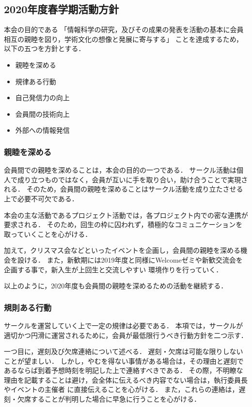 \subsection*{2020年度春学期活動方針}


本会の目的である
「情報科学の研究，及びその成果の発表を活動の基本に会員相互の親睦を図り，学術文化の想像と発展に寄与する」
ことを達成するため，以下の五つを方針とする．

\begin{itemize}
  \item 親睦を深める
  \item 規律ある行動
  \item 自己発信力の向上
  \item 会員間の技術向上
  \item 外部への情報発信
\end{itemize}

\subsubsection*{親睦を深める}
  会員間での親睦を深めることは，本会の目的の一つである．
  サークル活動は個人で成り立つものではなく，会員が互いに手を取り合い，助け合うことで実現される．
  そのため，会員間の親睦を深めることはサークル活動を成り立たさせる上で必要不可欠である．

  本会の主な活動であるプロジェクト活動では，各プロジェクト内での密な連携が要求される．
  そのため，回生の枠に囚われず，積極的なコミュニケーションを取っていくことを心がける．

  加えて，クリスマス会などといったイベントを企画し，会員間の親睦を深める機会を設ける．
  また，新歓期には2019年度と同様にWelcomeゼミや新歓交流会を企画する事で，新入生が上回生と交流しやすい
  環境作りを行っていく．

  以上のように，2020年度も会員間の親睦を深めるための活動を継続する．

\subsubsection*{規則ある行動}
  サークルを運営していく上で一定の規律は必要である．
  本項では，サークルが適切かつ円滑に運営されるために，会員が最低限行うべき行動方針を二つ示す．

  一つ目に，遅刻及び欠席連絡について述べる．
  遅刻・欠席は可能な限りしないことが望ましい．
  しかし，やむを得ない事情がある場合は，その理由と遅刻であるならば到着予想時刻を明記した上で連絡すべきである．
  その際，不明瞭な理由を記載することは避け，会全体に伝えるべき内容でない場合は，執行委員長やイベントの主催者
  に直接伝えることを心がける．
  また，これらの連絡は，遅刻・欠席することが判明した場合に早急に行うことを心がける．

